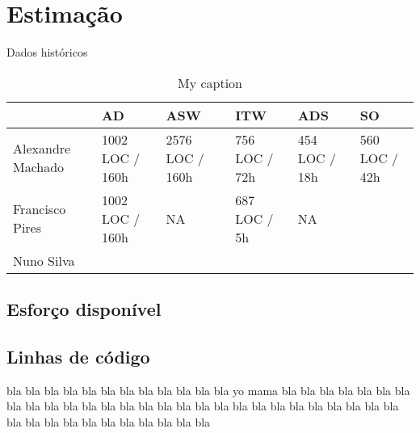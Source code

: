 \documentclass[12pt, a4paper, twoside]{report} %
\begin{document}
\clearpage

\section{Estimação}

Dados históricos

\begin{table}[h]
\centering
\begin{tabular}{|l|l|l|l|l|l|}
\hline
                  & AD              & ASW             & ITW           & ADS           & SO            \\ \hline
Alexandre Machado & 1002 LOC / 160h & 2576 LOC / 160h & 756 LOC / 72h & 454 LOC / 18h & 560 LOC / 42h \\ \hline
Francisco Pires   & 1002 LOC / 160h & NA              & 687 LOC / 5h  & NA            &               \\ \hline
Nuno Silva        &                 &                 &               &               &               \\ \hline
\end{tabular}
\caption{My caption}
\label{my-label}
\end{table}

\subsection{Esforço disponível}

\subsection{Linhas de código}

bla bla bla bla bla bla bla bla bla bla bla bla yo mama bla bla bla bla bla bla bla bla bla bla bla bla bla bla bla bla bla bla bla bla bla bla bla bla bla bla bla bla bla bla bla bla bla bla bla bla bla bla bla 
\end{document}

